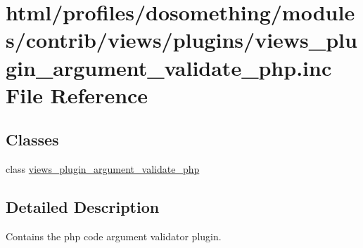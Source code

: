\hypertarget{views__plugin__argument__validate__php_8inc}{
\section{html/profiles/dosomething/modules/contrib/views/plugins/views\_\-plugin\_\-argument\_\-validate\_\-php.inc File Reference}
\label{views__plugin__argument__validate__php_8inc}
}
\subsection*{Classes}
\begin{DoxyCompactItemize}
\item 
class \hyperlink{classviews__plugin__argument__validate__php}{views\_\-plugin\_\-argument\_\-validate\_\-php}
\end{DoxyCompactItemize}


\subsection{Detailed Description}
Contains the php code argument validator plugin. 